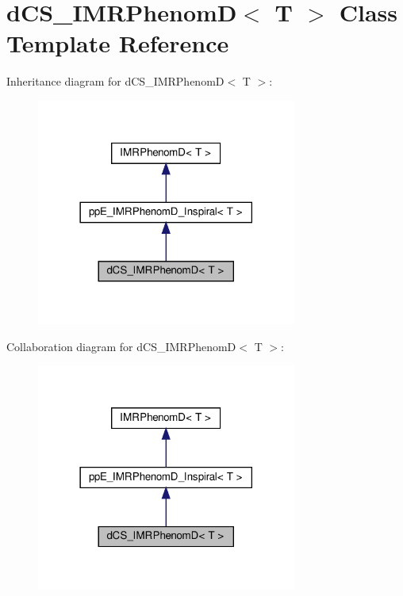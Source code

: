 \hypertarget{classdCS__IMRPhenomD}{}\section{d\+C\+S\+\_\+\+I\+M\+R\+PhenomD$<$ T $>$ Class Template Reference}
\label{classdCS__IMRPhenomD}


Inheritance diagram for d\+C\+S\+\_\+\+I\+M\+R\+PhenomD$<$ T $>$\+:\nopagebreak
\begin{figure}[H]
\begin{center}
\leavevmode
\includegraphics[width=242pt]{classdCS__IMRPhenomD__inherit__graph}
\end{center}
\end{figure}


Collaboration diagram for d\+C\+S\+\_\+\+I\+M\+R\+PhenomD$<$ T $>$\+:\nopagebreak
\begin{figure}[H]
\begin{center}
\leavevmode
\includegraphics[width=242pt]{classdCS__IMRPhenomD__coll__graph}
\end{center}
\end{figure}
